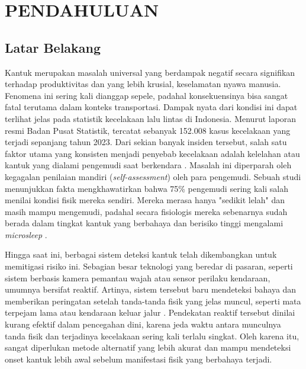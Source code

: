 \newpage
\chapter{PENDAHULUAN} \label{Bab I}

\section{Latar Belakang} \label{I.Latar Belakang}

	Kantuk merupakan masalah universal yang berdampak negatif secara signifikan terhadap produktivitas dan yang lebih krusial, keselamatan nyawa manusia. Fenomena ini sering kali dianggap sepele, padahal konsekuensinya bisa sangat fatal terutama dalam konteks transportasi. Dampak nyata dari kondisi ini dapat terlihat jelas pada statistik kecelakaan lalu lintas di Indonesia. Menurut laporan resmi Badan Pusat Statistik, tercatat sebanyak 152.008 kasus kecelakaan yang terjadi sepanjang tahun 2023. Dari sekian banyak insiden tersebut, salah satu faktor utama yang konsisten menjadi penyebab kecelakaan adalah kelelahan atau kantuk yang dialami pengemudi saat berkendara \cite{BPS:STD:2023}. Masalah ini diperparah oleh kegagalan penilaian mandiri (\textit{self-assessment}) oleh para pengemudi. Sebuah studi menunjukkan fakta mengkhawatirkan bahwa 75\% pengemudi sering kali salah menilai kondisi fisik mereka sendiri. Mereka merasa hanya "sedikit lelah" dan masih mampu mengemudi, padahal secara fisiologis mereka sebenarnya sudah berada dalam tingkat kantuk yang berbahaya dan berisiko tinggi mengalami \textit{microsleep} \cite{Gaspar2023}.

    Hingga saat ini, berbagai sistem deteksi kantuk telah dikembangkan untuk memitigasi risiko ini. Sebagian besar teknologi yang beredar di pasaran, seperti sistem berbasis kamera pemantau wajah atau sensor perilaku kendaraan, umumnya bersifat reaktif. Artinya, sistem tersebut baru mendeteksi bahaya dan memberikan peringatan setelah tanda-tanda fisik yang jelas muncul, seperti mata terpejam lama atau kendaraan keluar jalur \cite{Albadawi2022Review}. Pendekatan reaktif tersebut dinilai kurang efektif dalam pencegahan dini, karena jeda waktu antara munculnya tanda fisik dan terjadinya kecelakaan sering kali terlalu singkat. Oleh karena itu, sangat diperlukan metode alternatif yang lebih akurat dan mampu mendeteksi onset kantuk lebih awal sebelum manifestasi fisik yang berbahaya terjadi.

